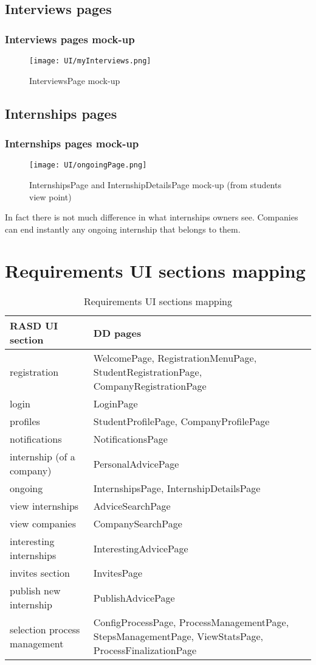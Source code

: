 	\subsection{Interviews pages}
	\subsubsection{Interviews pages mock-up}
	\begin{figure}[H]
		\centering
		\caption{InterviewsPage mock-up}
		\texttt{[image: UI/myInterviews.png]}
	\end{figure}
	\subsection{Internships pages}
	\subsubsection{Internships pages mock-up}
	\begin{figure}[H]
		\centering
		\caption{InternshipsPage and InternshipDetailsPage mock-up (from students view point)}
		\texttt{[image: UI/ongoingPage.png]}
	\end{figure}
	In fact there is not much difference in what internships owners see. Companies can end instantly any ongoing internship that belongs to them.
	\section{Requirements UI sections mapping}
		\begin{table}[H]
			\begin{tabular}{ | m{6cm} | m{6cm} | } 
				\hline
					\textbf {RASD UI section} & \textbf{DD pages} \\
				\hline
					registration & WelcomePage, RegistrationMenuPage, StudentRegistrationPage, CompanyRegistrationPage\\
				\hline
					login & LoginPage\\
				\hline
					profiles & StudentProfilePage, CompanyProfilePage \\
				\hline
					notifications & NotificationsPage\\
				\hline
					internship (of a company) & PersonalAdvicePage\\
				\hline
					ongoing & InternshipsPage, InternshipDetailsPage\\
				\hline
					view internships & AdviceSearchPage\\
				\hline
					view companies & CompanySearchPage\\
				\hline
					interesting internships & InterestingAdvicePage\\
				\hline
					invites section & InvitesPage\\
				\hline
					publish new internship & PublishAdvicePage\\
				\hline
					selection process management & ConfigProcessPage, ProcessManagementPage, StepsManagementPage, ViewStatsPage, ProcessFinalizationPage \\
				\hline
			\end{tabular}
			\caption{Requirements UI sections mapping}
		\end{table}